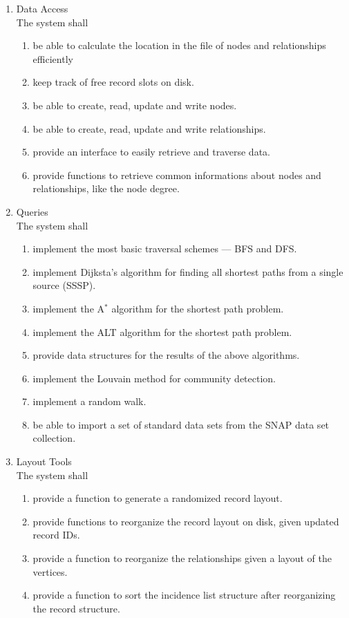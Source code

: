 \begin{enumerate}[label*=\arabic*]
\item Data Access \\
    The system shall
	\begin{enumerate}[label*=\arabic*]
    \item be able to calculate the location in the file of nodes and relationships efficiently
    \item keep track of free record slots on disk.
	\item be able to create, read, update and write nodes.
	\item be able to create, read, update and write relationships.
	\item provide an interface to easily retrieve and traverse data.
    \item provide functions to retrieve common informations about nodes and relationships, like the node degree.
	\end{enumerate}

\item Queries \\
    The system shall
	\begin{enumerate}[label*=\arabic*]
	\item implement the most basic traversal schemes --- BFS and DFS.
	\item implement Dijksta's algorithm for finding all shortest paths from a single source (SSSP).
	\item implement the A$^*$ algorithm for the shortest path problem.
	\item implement the ALT algorithm for the shortest path problem.
	\item provide data structures for the results of the above algorithms.
	\item implement the Louvain method for community detection.
	\item implement a random walk.
	\item be able to import a set of standard data sets from the SNAP data set collection.
	\end{enumerate}

\item Layout Tools \\
    The system shall
\begin{enumerate}[label*=\arabic*]
	\item provide a function to generate a randomized record layout.
	\item provide functions to reorganize the record layout on disk, given updated record IDs.
	\item provide a function to reorganize the relationships given a layout of the vertices.
	\item provide a function to sort the incidence list structure after reorganizing the record structure.
\end{enumerate}


\end{enumerate}
